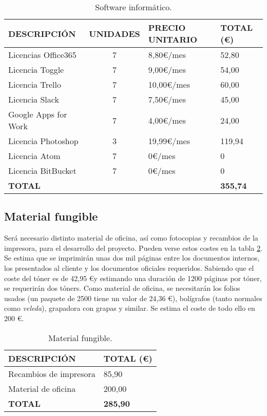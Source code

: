 \begin{table}[H]
\begin{center}
\begin{tabular}{l c l l}
\textbf{DESCRIPCIÓN} & \textbf{UNIDADES} & \textbf{PRECIO UNITARIO} & \textbf{TOTAL (\euro)}\\ \hline \hline
Licencias Office365 & 7 & 8,80\euro/mes & 52,80\\
Licencia Toggle & 7 & 9,00\euro/mes & 54,00\\
Licencia Trello & 7 & 10,00\euro/mes & 60,00\\
Licencia Slack & 7 & 7,50\euro/mes & 45,00\\
Google Apps for Work & 7 & 4,00\euro/mes & 24,00\\
Licencia Photoshop & 3 & 19,99\euro/mes & 119,94\\
Licencia Atom & 7 & 0\euro/mes & 0\\
Licencia BitBucket & 7 & 0\euro/mes & 0\\ \hline \hline
\textbf{TOTAL} & & & \textbf{355,74}\\ \hline
\end{tabular}
\caption{Software informático.}
\label{tab:software}
\end{center}
\end{table}



\subsection{Material fungible}
\par Será necesario distinto material de oficina, así como fotocopias y recambios de la impresora, para el desarrollo del proyecto. Pueden verse estos costes en la tabla \ref{tab:fungible}. Se estima que se imprimirán unas dos mil páginas entre los documentos internos, los presentados al cliente y los documentos oficiales requeridos. Sabiendo que el coste del tóner es de 42,95 \euro y estimando una duración de 1200 páginas por tóner, se requerirán dos tóners.
Como material de oficina, se necesitarán los folios usados (un paquete de 2500 tiene un valor de 24,36 \euro), bolígrafos (tanto normales como \textit{veleda}), grapadora con grapas y similar. Se estima el coste de todo ello en 200 \euro.


\begin{table}[H]
\begin{center}
\begin{tabular}{l l}
\textbf{DESCRIPCIÓN} & \textbf{TOTAL (\euro)}\\ \hline \hline
Recambios de impresora & 85,90\\
Material de oficina & 200,00\\ \hline \hline
\textbf{TOTAL} & \textbf{285,90}\\ \hline
\end{tabular}
\caption{Material fungible.}
\label{tab:fungible}
\end{center}
\end{table}


